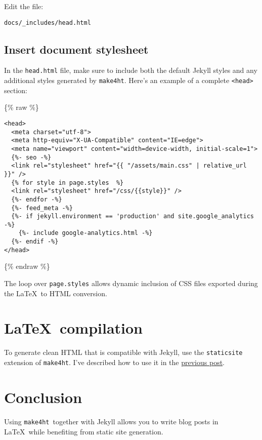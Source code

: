 \documentclass{article}
\def\makeht{\texttt{make4ht}}
\newcommand\liquidtag[1]{%
  \ifdefined\HCode\NoFonts\IgnorePar\EndP\HCode{\Hnewline}\{\% #1 \%\}\EndNoFonts\fi%
}
\begin{document}
Edit the file:

\begin{verbatim}
docs/_includes/head.html
\end{verbatim}

\subsection{Insert document stylesheet}

In the \texttt{head.html} file, make sure to include both the default Jekyll styles
and any additional styles generated by \makeht. Here's an example of a complete \texttt{<head>} section:

\liquidtag{raw}
\begin{verbatim}
<head>
  <meta charset="utf-8">
  <meta http-equiv="X-UA-Compatible" content="IE=edge">
  <meta name="viewport" content="width=device-width, initial-scale=1">
  {%- seo -%}
  <link rel="stylesheet" href="{{ "/assets/main.css" | relative_url }}" />
  {% for style in page.styles  %}
  <link rel="stylesheet" href="/css/{{style}}" />
  {%- endfor -%}
  {%- feed_meta -%}
  {%- if jekyll.environment == 'production' and site.google_analytics -%}
    {%- include google-analytics.html -%}
  {%- endif -%}
</head>
\end{verbatim}
\liquidtag{endraw}

The loop over \texttt{page.styles} allows dynamic inclusion of CSS files 
exported during the \LaTeX\ to HTML conversion.

\section{\LaTeX\ compilation}

To generate clean HTML that is compatible with Jekyll, 
use the \texttt{staticsite} extension of \makeht. I've described
how to use it in the \href{testblog/2021/07/30/how-to-blog-with-tex4ht.html}{previous post}.


\section{Conclusion}

Using \makeht\ together with Jekyll allows you to write blog posts in \LaTeX\ 
while benefiting from static site generation. 
\end{document}
